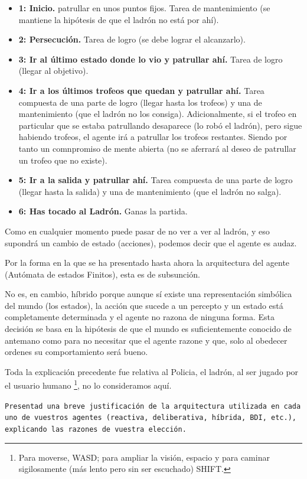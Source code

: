 \documentclass{article}
\begin{document}
\begin{itemize}
	\item \textbf{1: Inicio.} patrullar en unos puntos fijos. Tarea de mantenimiento (se mantiene la hipótesis de que el ladrón no está por ahí).
	\item \textbf{2: Persecución.} Tarea de logro (se debe lograr el alcanzarlo).
	\item \textbf{3: Ir al último estado donde lo vio y patrullar ahí.} Tarea de logro (llegar al objetivo).
\item \textbf{4: Ir a los últimos trofeos que quedan y patrullar ahí.} Tarea compuesta de una parte de logro (llegar hasta los trofeos) y una de mantenimiento (que el ladrón no los consiga). Adicionalmente, si el trofeo en particular que se estaba patrullando desaparece (lo robó el ladrón), pero sigue habiendo trofeos, el agente irá a patrullar los trofeos restantes. Siendo por tanto un comnpromiso de mente abierta (no se aferrará al deseo de patrullar un trofeo que no existe).
\item \textbf{5: Ir a la salida y patrullar ahí.} Tarea compuesta de una parte de logro (llegar hasta la salida) y una de mantenimiento (que el ladrón no salga). 
\item \textbf{6: Has tocado al Ladrón.} Ganas la partida.
\end{itemize}


Como en cualquier momento puede pasar de no ver a ver al  ladrón, y eso supondrá un cambio de estado (acciones), podemos decir que el agente es audaz.

Por la forma en la que se ha presentado hasta ahora la arquitectura  del agente (Autómata de estados Finitos), esta es de subsunción.

No es, en cambio, híbrido porque aunque sí existe una representación simbólica del mundo (los estados), la acción que sucede a un percepto y un estado está completamente determinada y el agente no razona de ninguna forma. Esta decisión se basa en la hipótesis de que el mundo es suficientemente conocido de antemano como para no necesitar que el agente razone y que, solo al obedecer ordenes su comportamiento será bueno.

Toda la explicación precedente fue relativa al Policia, el ladrón, al ser jugado por el usuario humano \footnote{Para moverse, WASD; para ampliar la visión, espacio y para caminar sigilosamente (más lento pero sin ser escuchado) SHIFT.}, no lo consideramos aquí.

\texttt{Presentad una breve justificación de la arquitectura utilizada en cada uno de vuestros agentes (reactiva, deliberativa, híbrida, BDI, etc.), explicando las razones de vuestra elección.}
\end{document}

